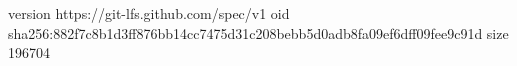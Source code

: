 version https://git-lfs.github.com/spec/v1
oid sha256:882f7c8b1d3ff876bb14cc7475d31c208bebb5d0adb8fa09ef6dff09fee9c91d
size 196704
